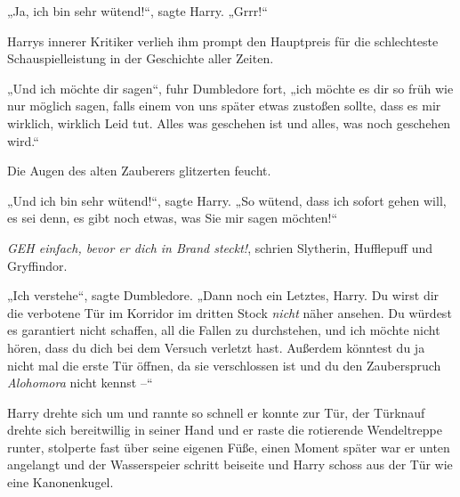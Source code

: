 „Ja, ich bin sehr wütend!“, sagte Harry. „Grrr!“

Harrys innerer Kritiker verlieh ihm prompt den Hauptpreis für die schlechteste Schauspielleistung in der Geschichte aller Zeiten.

„Und ich möchte dir sagen“, fuhr Dumbledore fort, „ich möchte es dir so früh wie nur möglich sagen, falls einem von uns später etwas zustoßen sollte, dass es mir wirklich, wirklich Leid tut. Alles was geschehen ist und alles, was noch geschehen wird.“

Die Augen des alten Zauberers glitzerten feucht.

„Und ich bin sehr wütend!“, sagte Harry. „So wütend, dass ich sofort gehen will, es sei denn, es gibt noch etwas, was Sie mir sagen möchten!“

\emph{GEH einfach, bevor er dich in Brand steckt!}, schrien Slytherin, Hufflepuff und Gryffindor.

„Ich verstehe“, sagte Dumbledore. „Dann noch ein Letztes, Harry. Du wirst dir die verbotene Tür im Korridor im dritten Stock \emph{nicht} näher ansehen. Du würdest es garantiert nicht schaffen, all die Fallen zu durchstehen, und ich möchte nicht hören, dass du dich bei dem Versuch verletzt hast. Außerdem könntest du ja nicht mal die erste Tür öffnen, da sie verschlossen ist und du den Zauberspruch \emph{Alohomora} nicht kennst –“

Harry drehte sich um und rannte so schnell er konnte zur Tür, der Türknauf drehte sich bereitwillig in seiner Hand und er raste die rotierende Wendeltreppe runter, stolperte fast über seine eigenen Füße, einen Moment später war er unten angelangt und der Wasserspeier schritt beiseite und Harry schoss aus der Tür wie eine Kanonenkugel.

